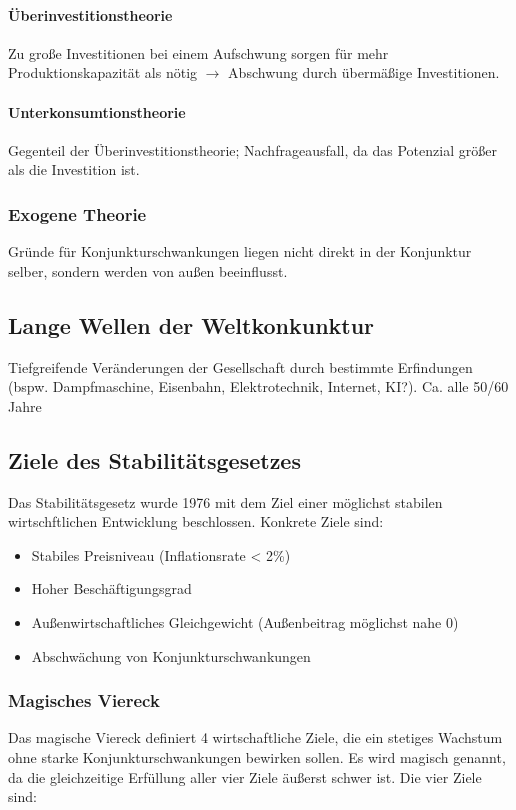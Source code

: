 \documentclass{article}
\begin{document}
	\paragraph{Überinvestitionstheorie}
	Zu große Investitionen bei einem Aufschwung sorgen für mehr Produktionskapazität als nötig $\rightarrow$ Abschwung durch übermäßige Investitionen.

	\paragraph{Unterkonsumtionstheorie}
	Gegenteil der Überinvestitionstheorie; Nachfrageausfall, da das Potenzial größer als die Investition ist.

	\subsubsection{Exogene Theorie}
	Gründe für Konjunkturschwankungen liegen nicht direkt in der Konjunktur selber, sondern werden von außen beeinflusst.

	\subsection{Lange Wellen der Weltkonkunktur}
	Tiefgreifende Veränderungen der Gesellschaft durch bestimmte Erfindungen (bspw. Dampfmaschine, Eisenbahn, Elektrotechnik, Internet, KI?). Ca. alle 50/60 Jahre

	\subsection{Ziele des Stabilitätsgesetzes}
	Das Stabilitätsgesetz wurde 1976 mit dem Ziel einer möglichst stabilen wirtschftlichen Entwicklung beschlossen. Konkrete Ziele sind:

	\begin{itemize}
		\item Stabiles Preisniveau (Inflationsrate < 2\%)
		\item Hoher Beschäftigungsgrad
		\item Außenwirtschaftliches Gleichgewicht (Außenbeitrag möglichst nahe 0)
		\item Abschwächung von Konjunkturschwankungen
	\end{itemize}

	\subsubsection{Magisches Viereck}
	Das magische Viereck definiert 4 wirtschaftliche Ziele, die ein stetiges Wachstum ohne starke Konjunkturschwankungen bewirken sollen. Es wird magisch genannt, da die gleichzeitige Erfüllung aller vier Ziele äußerst schwer ist. Die vier Ziele sind:
\end{document}
